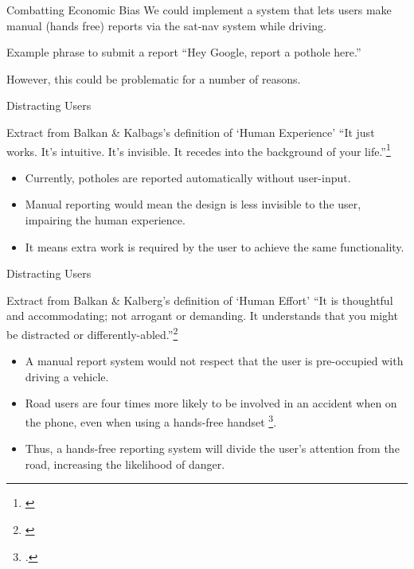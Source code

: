 \documentclass{beamer}
\begin{document}
\begin{frame}{Combatting Economic Bias}
    We could implement a system that lets users make manual (hands free) reports via the sat-nav system while driving.

    \begin{exampleblock}{Example phrase to submit a report}
        ``Hey Google, report a pothole here.''
    \end{exampleblock}

    However, this could be problematic for a number of reasons.
\end{frame}

\begin{frame}{Distracting Users}
    \begin{block}{Extract from Balkan \& Kalbags's definition of `Human Experience'}
        ``It just works. It's intuitive. It's invisible. It recedes into the background of your life.''\footnote[frame]{\cite{ethical-hierarchy-of-needs}}
    \end{block}

    \begin{itemize}
        \item Currently, potholes are reported automatically without user-input.
        \item Manual reporting would mean the design is \alert{less invisible} to the user, \alert{impairing the human experience}.
        \item It means extra work is required by the user to achieve the same functionality.
    \end{itemize}
\end{frame}

\begin{frame}{Distracting Users}
    \begin{block}{Extract from Balkan \& Kalberg's definition of `Human Effort'}
        ``It is thoughtful and accommodating; not arrogant or demanding. It understands that you might be distracted or differently-abled.''\footnote[frame]{\cite{ethical-hierarchy-of-needs}}
    \end{block}

    \begin{itemize}
        \item A manual report system \alert{would not respect that the user is pre-occupied} with driving a vehicle.
        \item Road users are four times more likely to be involved in an accident when on the phone, even when using a hands-free handset \footcite{hands-free-call}.
        \item Thus, a hands-free reporting system will divide the user's attention from the road, increasing the likelihood of danger.
    \end{itemize}
\end{frame}
\end{document}
